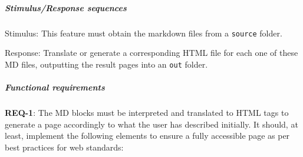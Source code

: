 \subparagraph{Stimulus/Response
sequences}\label{subpar:stimulusresponse-sequences}

Stimulus: This feature must obtain the markdown files from a
\texttt{source} folder.

Response: Translate or generate a corresponding HTML file for each one
of these MD files, outputting the result pages into an \texttt{out}
folder.

\subparagraph{Functional requirements}\label{subpar:functional-requirements}

\textbf{REQ-1}: The MD blocks must be interpreted and translated to HTML
tags to generate a page accordingly to what the user has described
initially. It should, at least, implement the following elements to
ensure a fully accessible page as per best practices for web standards:

